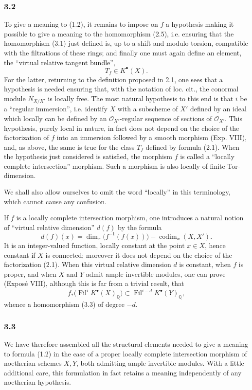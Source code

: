 \documentclass[11pt]{article}
\newcommand{\Fil}{\operatorname{Fil}}
\providecommand{\codim}{\operatorname{codim}}
\providecommand{\codim}{\operatorname{codim}}
\begin{document}
\subsubsection*{3.2}
To give a meaning to (1.2), it remains to impose on $f$ a hypothesis making it possible to give a meaning to the homomorphism (2.5), i.e. ensuring that the homomorphism (3.1) just defined is, up to a shift and modulo torsion, compatible with the filtrations of these rings; and finally one must again define an element, the ``virtual relative tangent bundle'',
\[
T_f\in K^\bullet(X).
\]
For the latter, returning to the definition proposed in 2.1, one sees that a hypothesis is needed ensuring that, with the notation of loc. cit., the conormal module $N_{X/X'}$ is locally free. The most natural hypothesis to this end is that $i$ be a ``regular immersion'', i.e. identify $X$ with a subscheme of $X'$ defined by an ideal which locally can be defined by an $\mathcal O_{X'}$-regular sequence of sections of $\mathcal O_{X'}$. This hypothesis, purely local in nature, in fact does not depend on the choice of the factorization of $f$ into an immersion followed by a smooth morphism (Exp. VIII), and, as above, the same is true for the class $T_f$ defined by formula (2.1). When the hypothesis just considered is satisfied, the morphism $f$ is called a ``locally complete intersection'' morphism. Such a morphism is also locally of finite Tor-dimension.

We shall also allow ourselves to omit the word ``locally'' in this terminology, which cannot cause any confusion.

If $f$ is a locally complete intersection morphism, one introduces a natural notion of ``virtual relative dimension'' $d(f)$ by the formula
\[
d(f)(x)=\dim_x\bigl(f^{-1}(f(x))\bigr)-\codim_x(X,X').
\]
It is an integer-valued function, locally constant at the point $x\in X$, hence constant if $X$ is connected; moreover it does not depend on the choice of the factorization (2.1). When this virtual relative dimension $d$ is constant, when $f$ is proper, and when $X$ and $Y$ admit ample invertible modules, one can prove (Expos\'e VIII), although this is far from a trivial result, that
\begin{equation}\tag{3.4}
f_*\bigl(\Fil^i K^\bullet(X)_{\mathbb Q}\bigr)\subset \Fil^{i-d}K^\bullet(Y)_{\mathbb Q},
\end{equation}
whence a homomorphism (3.3) of degree $-d$.

\subsubsection*{3.3}
We have therefore assembled all the structural elements needed to give a meaning to formula (1.2) in the case of a proper locally complete intersection morphism of noetherian schemes $X,Y$, both admitting ample invertible modules. With a little additional care, this formulation in fact retains a meaning independently of any noetherian hypothesis.
\end{document}
